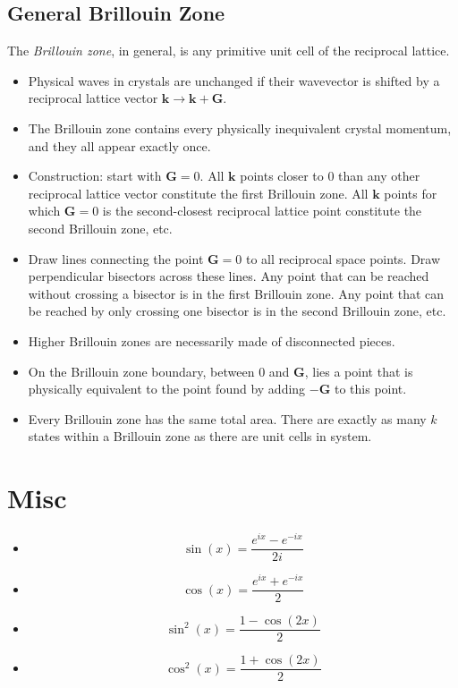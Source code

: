 \documentclass[10pt]{article}
\begin{document}
\begin{itemize}
\subsection{General Brillouin Zone}
The \emph{Brillouin zone}, in general, is any primitive unit cell of the reciprocal lattice.
\begin{itemize}
  \item Physical waves in crystals are unchanged if their wavevector is shifted by a reciprocal lattice vector $\textbf{k} \rightarrow \textbf{k} + \textbf{G}$.
  \item The Brillouin zone contains every physically inequivalent crystal momentum, and they all appear exactly once.
  \item Construction: start with $\textbf{G} = 0$. All $\textbf{k}$ points closer to 0 than any other reciprocal lattice vector constitute the first
  Brillouin zone. All $\textbf{k}$ points for which $\textbf{G} = 0$ is the second-closest reciprocal lattice point constitute the second Brillouin zone, etc.
  \item Draw lines connecting the point $\textbf{G} = 0$ to all reciprocal space points. Draw perpendicular bisectors across these lines. Any point that can be
  reached without crossing a bisector is in the first Brillouin zone. Any point that can be reached by only crossing one bisector is in the second Brillouin zone, etc.
  \item Higher Brillouin zones are necessarily made of disconnected pieces.
  \item On the Brillouin zone boundary, between 0 and $\textbf{G}$, lies a point that is physically equivalent to the point found by adding $-\textbf{G}$ to this point.
  \item Every Brillouin zone has the same total area. There are exactly as many $k$ states within a Brillouin zone as there are unit cells in system.
\end{itemize}

\end{itemize}
\section{Misc}
\begin{itemize}
  \item $$\sin(x) = \frac{e^{ix} - e^{-ix}}{2i}$$
  \item $$\cos(x) = \frac{e^{ix} + e^{-ix}}{2}$$
  \item $$\sin^{2}(x) = \frac{1 - \cos(2x)}{2}$$
  \item $$\cos^{2}(x) = \frac{1 + \cos(2x)}{2}$$
\end{itemize}
\end{document}
